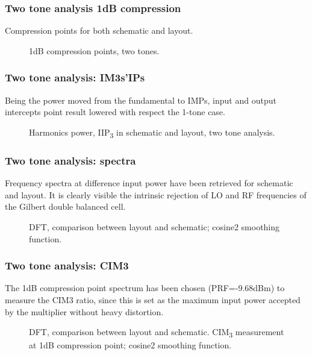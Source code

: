 \begin{frame}
\frametitle{Two tone analysis 1dB compression}
	Compression points for both schematic and layout.
	\begin{figure}[H] 
		\centering
		\caption{1dB compression points, two tones.}
		\label{fig:1dB_2tones}
	\end{figure}
\end{frame}


\begin{frame}
\frametitle{Two tone analysis: IM3s'IPs}
Being the power moved from the fundamental to IMPs, input and output intercepts point result lowered with respect the 1-tone case.
\begin{figure}[H] 
	\centering
	\caption{Harmonics power, IIP\textsubscript{3} in schematic and layout, two tone analysis.}
	\label{fig:IIP3_2t_schem}
\end{figure}
\end{frame}

\begin{frame}
\frametitle{Two tone analysis: spectra}
Frequency spectra at difference input power have been retrieved for schematic and layout. It is clearly visible the intrinsic rejection of LO and RF frequencies of the Gilbert double balanced cell.
\begin{figure}[H] 
	\centering
	\caption{DFT, comparison between layout and schematic; cosine2 smoothing function.}
	\label{fig:DFT_2ton}
\end{figure}
\end{frame}


\begin{frame}
\frametitle{Two tone analysis: CIM3}
The 1dB compression point spectrum has been chosen (PRF=-9.68dBm) to measure the CIM3 ratio, since this is set as the maximum input power accepted by the multiplier without heavy distortion.
\begin{figure}[H] 
	\centering
	\caption{DFT, comparison between layout and schematic. CIM\textsubscript{3} measurement at 1dB compression point; cosine2 smoothing function. }
	\label{fig:DFT_2ton_zoom}
\end{figure}
\end{frame}

